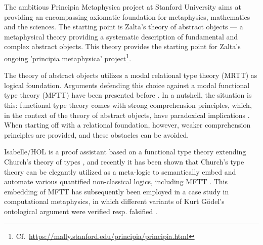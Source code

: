 %
\begin{isabellebody}%
\def\isabellecontext{AbstractObjects}%
%
\isadelimtheory
%
\endisadelimtheory
%
\isatagtheory
%
\endisatagtheory
{\isafoldtheory}%
%
\isadelimtheory
%
\endisadelimtheory
%
\isamarkuptrue%
%
\begin{isamarkuptext}%
The ambitious Principia Metaphysica \cite{zalta:_princ_metap} project at Stanford University aims
  at providing an encompassing axiomatic foundation for metaphysics, mathematics and the sciences. 
  The starting point is Zalta's theory of abstract objects \cite{zalta83:_abstr_objec}  --- a metaphysical 
  theory providing a systematic description of fundamental and complex abstract objects. This 
  theory provides the starting point for Zalta's ongoing 'principia metaphysica' 
  project\footnote{Cf.~\url{https://mally.stanford.edu/principia/principia.html}}.
  
  The theory of abstract objects utilizes a modal relational type theory (MRTT) as 
  logical foundation.  Arguments
  defending this choice against a modal functional type theory (MFTT)
  have been presented before \cite{zalta11:_relat_versus_funct_found_logic}.
  In a nutshell, the situation is this: functional type theory comes with strong 
  comprehension principles, which, in the context of the theory of abstract objects, 
  have paradoxical implications \cite[chap.4]{zalta11:_relat_versus_funct_found_logic}. 
  When starting off with a relational foundation, however, 
  weaker comprehension principles are provided, and these obstacles can be avoided.

  Isabelle/HOL is a proof assistant based on a functional type theory extending
  Church's theory of types \cite{Church40}, and recently it has been shown 
  that Church's type theory can be elegantly utilized as a meta-logic to semantically embed and 
  automate various quantified non-classical logics, including MFTT \cite{J23,C40}. 
  This embedding of MFTT has subsequently been employed in a case study in
  computational metaphysics, in which different variants of Kurt G{\"o}del's ontological 
  argument were verified resp. falsified \cite{C40,C55}. 
 

\end{isamarkuptext}
\end{isabellebody}
